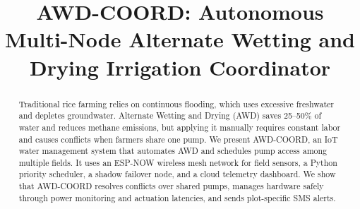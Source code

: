 \documentclass[conference]{IEEEtran}
\begin{document}
\title{AWD-COORD: Autonomous Multi-Node Alternate Wetting and Drying Irrigation Coordinator\\
}

\author{
\and
{}
\and
{}
\and
{}
\and
{}
\and
{}
}

\maketitle

\begin{abstract}
Traditional rice farming relies on continuous flooding, which uses excessive freshwater and depletes groundwater. Alternate Wetting and Drying (AWD) saves 25--50\% of water and reduces methane emissions, but applying it manually requires constant labor and causes conflicts when farmers share one pump. We present AWD-COORD, an IoT water management system that automates AWD and schedules pump access among multiple fields. It uses an ESP-NOW wireless mesh network for field sensors, a Python priority scheduler, a shadow failover node, and a cloud telemetry dashboard. We show that AWD-COORD resolves conflicts over shared pumps, manages hardware safely through power monitoring and actuation latencies, and sends plot-specific SMS alerts.
\end{abstract}
\end{document}
